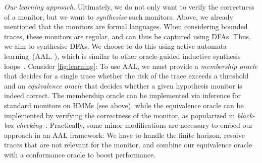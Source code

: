 \documentclass[runningheads]{llncs}
\newcommand{\sebastian}[1]{\textcolor{red}{SJ: #1}}
\renewcommand{\paragraph}[1]{\smallskip\noindent\emph{#1}}
\begin{document}
\paragraph{Our learning approach. }
Ultimately, we do not only want to verify the correctness of a monitor, but we want to \emph{synthesise} such monitors.
Above, we already mentioned that the monitors are formal languages. When considering bounded traces, these monitors are regular, and can thus be captured using DFAs. Thus, we aim to synthesise DFAs.
We choose to do this using active automata learning~(AAL, \cite{DBLP:journals/iandc/Angluin87,DBLP:journals/cacm/Vaandrager17}), which is similar to other oracle-guided inductive synthesis loops~\cite{DBLP:journals/acta/JhaS17}.
Consider \cref{fig:learning}:
To use AAL, we must provide a \emph{membership oracle} that decides for a single trace whether the risk of the trace exceeds a threshold and an \emph{equivalence oracle} that decides whether a given hypothesis monitor is indeed correct. The membership oracle can be implemented via inference for standard monitors on HMMs (see above), while the equivalence oracle can be implemented by verifying the correctness of the monitor, as popularized in \emph{black-box checking}~\cite{DBLP:journals/jalc/PeledVY02}.
Practically, some minor modifications are necessary to embed our approach in an AAL framework: We have to handle the finite horizon, resolve traces that are not relevant for the monitor, and combine our equivalence oracle with a conformance oracle to boost performance. %
%
%
\end{document}
